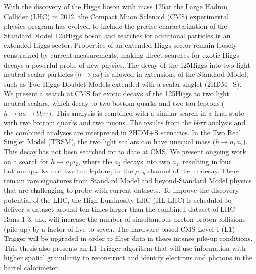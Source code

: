 With the discovery of the Higgs boson with mass 125\GeV at the Large Hadron Collider (LHC) in 2012, the Compact Muon Solenoid (CMS) experimental physics program has evolved to include the precise characterization of the Standard Model 125\GeV Higgs boson and searches for additional particles in an extended Higgs sector. Properties of an extended Higgs sector remain loosely constrained by current measurements, making direct searches for exotic Higgs decays a powerful probe of new physics. The decay of the 125\GeV Higgs into two light neutral scalar particles ($h\rightarrow aa$) is allowed in extensions of the Standard Model, such as Two Higgs Doublet Models extended with a scalar singlet (2HDM+S). We present a search at CMS for exotic decays of the 125\GeV Higgs to two light neutral scalars, which decay to two bottom quarks and two tau leptons ($h\rightarrow aa \rightarrow bb\tau\tau$). This analysis is combined with a similar search in a final state with two bottom quarks and two muons. The results from the $bb\tau\tau$ analysis and the combined analyses are interpreted in 2HDM+S scenarios. In the Two Real Singlet Model (TRSM), the two light scalars can have unequal mass ($h\rightarrow a_1 a_2$). This decay has not been searched for to date at CMS. We present ongoing work on a search for $h\rightarrow a_1 a_2$, where the $a_2$ decays into two $a_1$, resulting in four bottom quarks and two tau leptons, in the $\mu\tau_{h}$ channel of the $\tau\tau$ decay. There remain rare signatures from Standard Model and beyond-Standard Model physics that are challenging to probe with current datasets. To improve the discovery potential of the LHC, the High-Luminosity LHC (HL-LHC) is scheduled to deliver a dataset around ten times larger than the combined dataset of LHC Runs 1-3, and will increase the number of simultaneous proton-proton collisions (pile-up) by a factor of five to seven. The hardware-based CMS Level-1 (L1) Trigger will be upgraded in order to filter data in these intense pile-up conditions. This thesis also presents an L1 Trigger algorithm that will use information with higher spatial granularity to reconstruct and identify electrons and photons in the barrel calorimeter.
